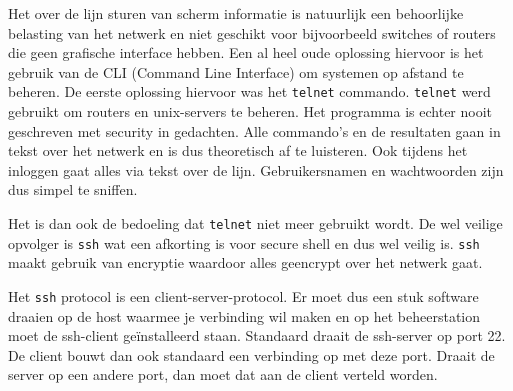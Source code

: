 Het over de lijn sturen van scherm informatie is natuurlijk een behoorlijke belasting van het netwerk en niet geschikt voor bijvoorbeeld switches of routers die geen grafische interface hebben. Een al heel oude oplossing hiervoor is het gebruik van de CLI (Command Line Interface) om systemen op afstand te beheren. De eerste oplossing hiervoor was het \texttt{telnet} commando. \texttt{telnet} werd gebruikt om routers en unix-servers te beheren. Het programma is echter nooit geschreven met security in gedachten. Alle commando's en de resultaten gaan in tekst over het netwerk en is dus theoretisch af te luisteren. Ook tijdens het inloggen gaat alles via tekst over de lijn. Gebruikersnamen en wachtwoorden zijn dus simpel te sniffen.

Het is dan ook de bedoeling dat \texttt{telnet} niet meer gebruikt wordt. De wel veilige opvolger is \texttt{ssh} wat een afkorting is voor secure shell en dus wel veilig is. \texttt{ssh} maakt gebruik van encryptie waardoor alles geencrypt over het netwerk gaat.

Het \texttt{ssh} protocol is een client-server-protocol. Er moet dus een stuk software draaien op de host waarmee je verbinding wil maken en op het beheerstation moet de ssh-client ge\"installeerd staan. Standaard draait de ssh-server op port 22. De client bouwt dan ook standaard een verbinding op met deze port. Draait de server op een andere port, dan moet dat aan de client verteld worden.

